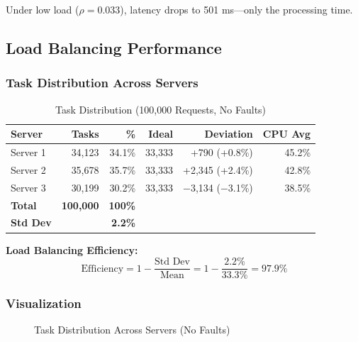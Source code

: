 \documentclass[12pt,a4paper]{article}
\begin{document}
Under low load ($\rho = 0.033$), latency drops to 501 ms---only the processing time.

\subsection{Load Balancing Performance}

\subsubsection{Task Distribution Across Servers}

\begin{table}[h]
\centering
\caption{Task Distribution (100,000 Requests, No Faults)}
\label{tab:task-distribution}
\begin{tabular}{@{}lrrrrr@{}}
\toprule
\textbf{Server} & \textbf{Tasks} & \textbf{\%} & \textbf{Ideal} & \textbf{Deviation} & \textbf{CPU Avg} \\
\midrule
Server 1 & 34,123 & 34.1\% & 33,333 & +790 (+0.8\%) & 45.2\% \\
Server 2 & 35,678 & 35.7\% & 33,333 & +2,345 (+2.4\%) & 42.8\% \\
Server 3 & 30,199 & 30.2\% & 33,333 & $-$3,134 ($-$3.1\%) & 38.5\% \\
\midrule
\textbf{Total} & \textbf{100,000} & \textbf{100\%} & & & \\
\textbf{Std Dev} & & \textbf{2.2\%} & & & \\
\bottomrule
\end{tabular}
\end{table}

\textbf{Load Balancing Efficiency:}
\begin{equation}
\text{Efficiency} = 1 - \frac{\text{Std Dev}}{\text{Mean}} = 1 - \frac{2.2\%}{33.3\%} = 97.9\%
\end{equation}

\subsubsection{Visualization}

\begin{figure}[h]
\centering
{}
\caption{Task Distribution Across Servers (No Faults)}
\label{fig:task-dist}
\end{figure}
\end{document}
